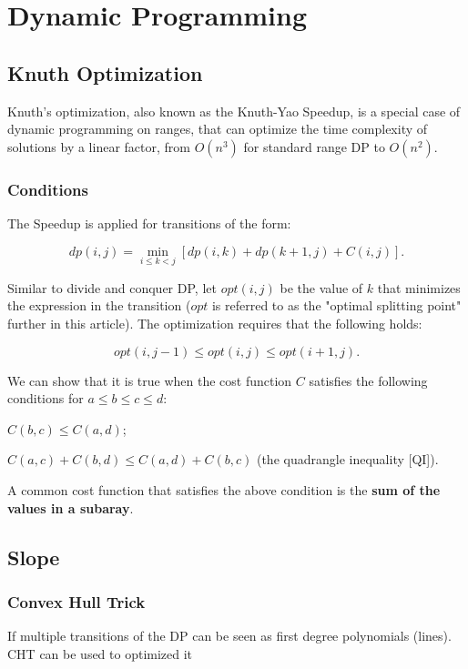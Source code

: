 \chapter{Dynamic Programming}

\section{Knuth Optimization}

    Knuth's optimization, also known as the Knuth-Yao Speedup, is a special case of dynamic programming on ranges, that can optimize the time complexity of solutions by a linear factor, from $O(n^3)$ for standard range DP to $O(n^2)$.

\subsection{Conditions}

    The Speedup is applied for transitions of the form:

    $$dp(i, j) = \min_{i \leq k < j} [ dp(i, k) + dp(k+1, j) + C(i, j) ].$$

    Similar to divide and conquer DP, let $opt(i, j)$ be the value of $k$ that minimizes the expression in the transition ($opt$ is referred to as the "optimal splitting point" further in this article). The optimization requires that the following holds:

    $$opt(i, j-1) \leq opt(i, j) \leq opt(i+1, j).$$

    We can show that it is true when the cost function 
    $C$ satisfies the following conditions for $a \leq b \leq c \leq d$:

    $C(b, c) \leq C(a, d)$;

    $C(a, c) + C(b, d) \leq C(a, d) + C(b, c)$ (the quadrangle inequality [QI]).

    A common cost function that satisfies the above condition is the \textbf{sum of the values in a subaray}.


\section{Slope}

\subsection{Convex Hull Trick}

    If multiple transitions of the DP can be seen as 
    first degree polynomials (lines). CHT can be used to optimized it

